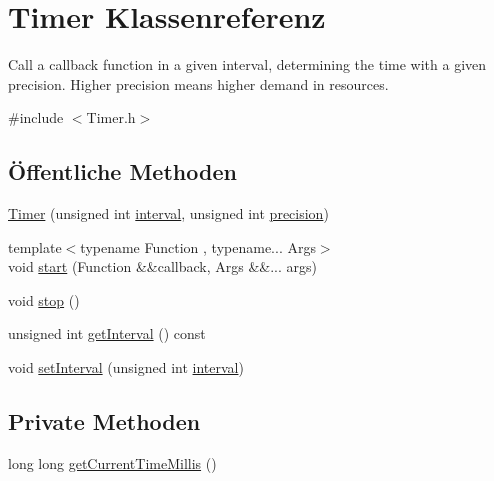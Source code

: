 \hypertarget{class_timer}{}\section{Timer Klassenreferenz}
\label{class_timer}


Call a callback function in a given interval, determining the time with a given precision. Higher precision means higher demand in resources.  




{\ttfamily \#include $<$Timer.\+h$>$}

\subsection*{Öffentliche Methoden}
\begin{DoxyCompactItemize}
\item 
\hyperlink{class_timer_a5b659c4fb572c549dad183a7b32b08df}{Timer} (unsigned int \hyperlink{class_timer_aaf9bce1286b714658a0f4484d8fee960}{interval}, unsigned int \hyperlink{class_timer_a3d1026dd88596a97cb6b768f475ed57f}{precision})
\item 
{\footnotesize template$<$typename Function , typename... Args$>$ }\\void \hyperlink{class_timer_adcf70b5065e31461e27309c96065437a}{start} (Function \&\&callback, Args \&\&... args)
\item 
void \hyperlink{class_timer_a63f0eb44b27402196590a03781515dba}{stop} ()
\item 
unsigned int \hyperlink{class_timer_a6cbb88b5073d95fd871a012966005618}{get\+Interval} () const
\item 
void \hyperlink{class_timer_a0b24293bfc154f7432b1c52ac857d853}{set\+Interval} (unsigned int \hyperlink{class_timer_aaf9bce1286b714658a0f4484d8fee960}{interval})
\end{DoxyCompactItemize}
\subsection*{Private Methoden}
\begin{DoxyCompactItemize}
\item 
long long \hyperlink{class_timer_a39a332f8ce3a45ed8d78c772755342c8}{get\+Current\+Time\+Millis} ()
\end{DoxyCompactItemize}
